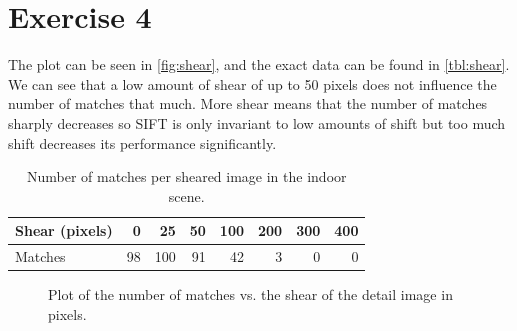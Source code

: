 \documentclass[a4paper]{article}
\begin{document}
\section{Exercise 4}
The plot can be seen in \autoref{fig:shear}, and the exact data can be found in \autoref{tbl:shear}. We can see that a low amount of shear of up to 50 pixels does not influence the number of matches that much. More shear means that the number of matches sharply decreases so SIFT is only invariant to low amounts of shift but too much shift decreases its performance significantly.

\begin{table}[h]
	\centering
	\caption{Number of matches per sheared image in the indoor scene.}
	\label{tbl:shear}
	\begin{tabular}{l|r|r|r|r|r|r|r}
		Shear (pixels) & 0 & 25 & 50 & 100 & 200 & 300 & 400 \\ \hline
		Matches & 98 & 100 & 91 & 42 & 3 & 0 & 0
	\end{tabular}
\end{table}

\begin{figure}
	\centering
{}
	\caption{Plot of the number of matches vs. the shear of the detail image in pixels.}
	\label{fig:shear}
\end{figure}



\end{document}
